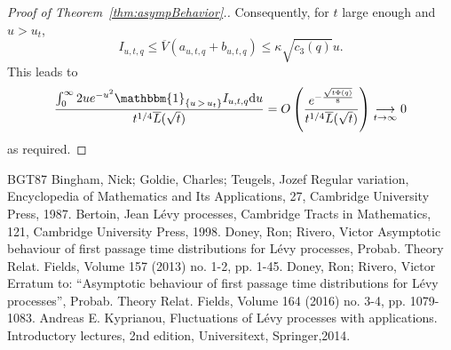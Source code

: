 \documentclass[10pt]{amsart}
\theoremstyle{definition}
\numberwithin{equation}{section}
\newcommand{\dd}{\mathrm{d}}
\newcommand{\ind}[1]{\mathbbm{1}_{\left\{#1\right\}}}
\renewcommand{\bar}[1]{\overline{#1}}
\begin{document}
\begin{proof}[Proof of Theorem~\ref{thm:asympBehavior}.]
Consequently, for $t$ large enough and $u>u_t$,
\begin{equation*}
I_{u,t,q} \leq \bar V \left(a_{u,t,q}+b_{u,t,q}\right) \leq \kappa \sqrt{c_3(q)} u.
\end{equation*}
This leads to
\begin{equation*}
\frac{\int_0^{\infty} 2ue^{-u^2} \ind{u\,>\,u_t}I_{u,t,q} \dd u}{t^{1/4} \bar L(\sqrt t)} =O \left(\frac{e^{-\frac{\sqrt{t \Phi(q)}}{8}}}{t^{1/4} \bar L(\sqrt t)} \right) \underset{t\rightarrow \infty} \longrightarrow 0
\end{equation*}
as required.
\end{proof}

\begin{thebibliography}{BGT87}
 Bingham, Nick; Goldie, Charles; Teugels, Jozef Regular variation, Encyclopedia of Mathematics and Its Applications, 27, Cambridge University Press, 1987.
 Bertoin, Jean Lévy processes, Cambridge Tracts in Mathematics, 121, Cambridge University Press, 1998.
 Doney, Ron; Rivero, Victor Asymptotic behaviour of first passage time distributions for Lévy processes, Probab. Theory Relat. Fields, Volume 157 (2013) no. 1-2, pp. 1-45.
 Doney, Ron; Rivero, Victor Erratum to: “Asymptotic behaviour of first passage time distributions for Lévy processes”, Probab. Theory Relat. Fields, Volume 164 (2016) no. 3-4, pp. 1079-1083.
 Andreas E. Kyprianou, Fluctuations of Lévy processes with applications. Introductory lectures, 2nd edition, Universitext, Springer,2014.
\end{thebibliography}
\end{document}

